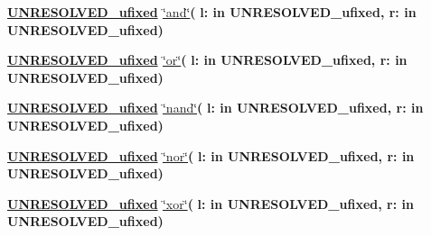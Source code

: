 \begin{DoxyCompactItemize}
\item 
{\bfseries {\bfseries {\bfseries \hyperlink{classfixed__pkg_ae78bc2b36d22f6abeac163955e8a587d}{U\+N\+R\+E\+S\+O\+L\+V\+E\+D\+\_\+ufixed}} \textcolor{vhdlchar}{ }}} \hyperlink{classfixed__pkg_aedf25d60eac5cf50e30c2a0229ac2940}{\char`\"{}and\char`\"{}}{\bfseries  ( }{\bfseries \textcolor{vhdlchar}{l\+: }\textcolor{stringliteral}{in }\textcolor{vhdlchar}{U\+N\+R\+E\+S\+O\+L\+V\+E\+D\+\_\+ufixed}}{\bfseries  , \textcolor{vhdlchar}{r\+: }\textcolor{stringliteral}{in }\textcolor{vhdlchar}{U\+N\+R\+E\+S\+O\+L\+V\+E\+D\+\_\+ufixed}}{\bfseries  )} 
\item 
{\bfseries {\bfseries {\bfseries \hyperlink{classfixed__pkg_ae78bc2b36d22f6abeac163955e8a587d}{U\+N\+R\+E\+S\+O\+L\+V\+E\+D\+\_\+ufixed}} \textcolor{vhdlchar}{ }}} \hyperlink{classfixed__pkg_a85c702ffe4d4eae7c3a69100e292bc9d}{\char`\"{}or\char`\"{}}{\bfseries  ( }{\bfseries \textcolor{vhdlchar}{l\+: }\textcolor{stringliteral}{in }\textcolor{vhdlchar}{U\+N\+R\+E\+S\+O\+L\+V\+E\+D\+\_\+ufixed}}{\bfseries  , \textcolor{vhdlchar}{r\+: }\textcolor{stringliteral}{in }\textcolor{vhdlchar}{U\+N\+R\+E\+S\+O\+L\+V\+E\+D\+\_\+ufixed}}{\bfseries  )} 
\item 
{\bfseries {\bfseries {\bfseries \hyperlink{classfixed__pkg_ae78bc2b36d22f6abeac163955e8a587d}{U\+N\+R\+E\+S\+O\+L\+V\+E\+D\+\_\+ufixed}} \textcolor{vhdlchar}{ }}} \hyperlink{classfixed__pkg_ae132355d3be87566c73b15b0bb03e43a}{\char`\"{}nand\char`\"{}}{\bfseries  ( }{\bfseries \textcolor{vhdlchar}{l\+: }\textcolor{stringliteral}{in }\textcolor{vhdlchar}{U\+N\+R\+E\+S\+O\+L\+V\+E\+D\+\_\+ufixed}}{\bfseries  , \textcolor{vhdlchar}{r\+: }\textcolor{stringliteral}{in }\textcolor{vhdlchar}{U\+N\+R\+E\+S\+O\+L\+V\+E\+D\+\_\+ufixed}}{\bfseries  )} 
\item 
{\bfseries {\bfseries {\bfseries \hyperlink{classfixed__pkg_ae78bc2b36d22f6abeac163955e8a587d}{U\+N\+R\+E\+S\+O\+L\+V\+E\+D\+\_\+ufixed}} \textcolor{vhdlchar}{ }}} \hyperlink{classfixed__pkg_a99703f0cfc5a44427350d64d56439e67}{\char`\"{}nor\char`\"{}}{\bfseries  ( }{\bfseries \textcolor{vhdlchar}{l\+: }\textcolor{stringliteral}{in }\textcolor{vhdlchar}{U\+N\+R\+E\+S\+O\+L\+V\+E\+D\+\_\+ufixed}}{\bfseries  , \textcolor{vhdlchar}{r\+: }\textcolor{stringliteral}{in }\textcolor{vhdlchar}{U\+N\+R\+E\+S\+O\+L\+V\+E\+D\+\_\+ufixed}}{\bfseries  )} 
\item 
{\bfseries {\bfseries {\bfseries \hyperlink{classfixed__pkg_ae78bc2b36d22f6abeac163955e8a587d}{U\+N\+R\+E\+S\+O\+L\+V\+E\+D\+\_\+ufixed}} \textcolor{vhdlchar}{ }}} \hyperlink{classfixed__pkg_a1be4316c23d44dca86a9e4535bdd3d5a}{\char`\"{}xor\char`\"{}}{\bfseries  ( }{\bfseries \textcolor{vhdlchar}{l\+: }\textcolor{stringliteral}{in }\textcolor{vhdlchar}{U\+N\+R\+E\+S\+O\+L\+V\+E\+D\+\_\+ufixed}}{\bfseries  , \textcolor{vhdlchar}{r\+: }\textcolor{stringliteral}{in }\textcolor{vhdlchar}{U\+N\+R\+E\+S\+O\+L\+V\+E\+D\+\_\+ufixed}}{\bfseries  )} 

\end{DoxyCompactItemize}

